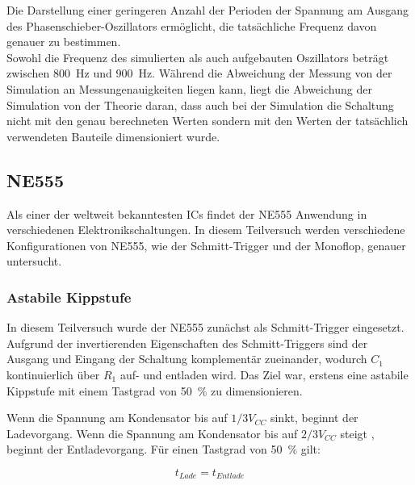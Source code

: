Die Darstellung einer geringeren Anzahl der Perioden der Spannung am Ausgang des Phasenschieber-Oszillators ermöglicht, die tatsächliche Frequenz davon genauer zu bestimmen.\\
Sowohl die Frequenz des simulierten als auch aufgebauten Oszillators beträgt zwischen \SI{800}{\hertz} und  \SI{900}{\hertz}. Während die Abweichung der Messung von der Simulation an Messungenauigkeiten liegen kann, liegt die Abweichung der Simulation von der Theorie daran, dass auch bei der Simulation die Schaltung nicht mit den genau berechneten Werten sondern mit den Werten der tatsächlich verwendeten Bauteile dimensioniert wurde.

\subsection{NE555}
Als einer der weltweit bekanntesten ICs findet der NE555 Anwendung in verschiedenen Elektronikschaltungen. In diesem Teilversuch werden verschiedene Konfigurationen von NE555, wie der Schmitt-Trigger und der Monoflop, genauer untersucht.
\subsubsection{Astabile Kippstufe}

In diesem Teilversuch wurde der NE555 zunächst als Schmitt-Trigger eingesetzt. Aufgrund der invertierenden Eigenschaften des Schmitt-Triggers sind der Ausgang und Eingang der Schaltung komplementär zueinander, wodurch $C_1$ kontinuierlich über $R_1$ auf- und entladen wird. Das Ziel war, erstens eine astabile Kippstufe mit einem Tastgrad von \SI{50}{\percent} zu dimensionieren.

Wenn die Spannung am Kondensator bis auf $1/3 V_{CC}$ sinkt, beginnt der Ladevorgang. Wenn die Spannung am Kondensator bis auf $2/3 V_{CC}$ steigt \cite{tietze1991electronic}, beginnt der Entladevorgang. Für einen Tastgrad von \SI{50}{\percent} gilt:

\begin{equation*}
    t_{Lade} =t_{Entlade}
\end{equation*}

